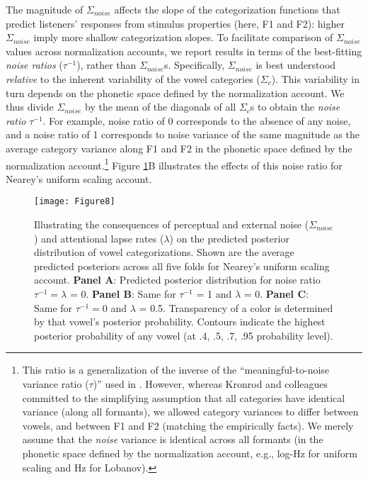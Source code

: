 \documentclass[preprint]{JASA}
\begin{document}
The magnitude of \(\Sigma_{noise}\) affects the slope of the categorization functions that predict listeners' responses from stimulus properties (here, F1 and F2): higher \(\Sigma_{noise}\) imply more shallow categorization slopes. To facilitate comparison of \(\Sigma_{noise}\) values across normalization accounts, we report results in terms of the best-fitting \emph{noise ratios} (\(\tau^{-1}\)), rather than \(\Sigma_{noise}\)s. Specifically, \(\Sigma_{noise}\) is best understood \emph{relative} to the inherent variability of the vowel categories (\(\Sigma_c\)). This variability in turn depends on the phonetic space defined by the normalization account. We thus divide \(\Sigma_{noise}\) by the mean of the diagonals of all \(\Sigma_c\)s to obtain the \emph{noise ratio} \(\tau^{-1}\). For example, noise ratio of 0 corresponds to the absence of any noise, and a noise ratio of 1 corresponds to noise variance of the same magnitude as the average category variance along F1 and F2 in the phonetic space defined by the normalization account.\footnote{This ratio is a generalization of the inverse of the ``meaningful-to-noise variance ratio (\(\tau\))'' used in \citet{kronrod2016}. However, whereas Kronrod and colleagues committed to the simplifying assumption that all categories have identical variance (along all formants), we allowed category variances to differ between vowels, and between F1 and F2 (matching the empirically facts). We merely assume that the \emph{noise} variance is identical across all formants (in the phonetic space defined by the normalization account, e.g., log-Hz for uniform scaling and Hz for Lobanov).} Figure \ref{fig:Figure8}B illustrates the effects of this noise ratio for Nearey's uniform scaling account.



\begin{figure}[!ht]

{\centering \texttt{[image: Figure8]} 

}

\caption{Illustrating the consequences of perceptual and external noise (\(\Sigma_{noise}\)) and attentional lapse rates (\(\lambda\)) on the predicted posterior distribution of vowel categorizations. Shown are the average predicted posteriors across all five folds for Nearey's uniform scaling account. \textbf{Panel A}: Predicted posterior distribution for noise ratio \(\tau^{-1} = \lambda\) = 0. \textbf{Panel B}: Same for \(\tau^{-1}\) = 1 and \(\lambda\) = 0. \textbf{Panel C}: Same for \(\tau^{-1} = 0\) and \(\lambda\) = 0.5. Transparency of a color is determined by that vowel's posterior probability. Contours indicate the highest posterior probability of any vowel (at .4, .5, .7, .95 probability level).}\label{fig:Figure8}
\end{figure}
\end{document}
